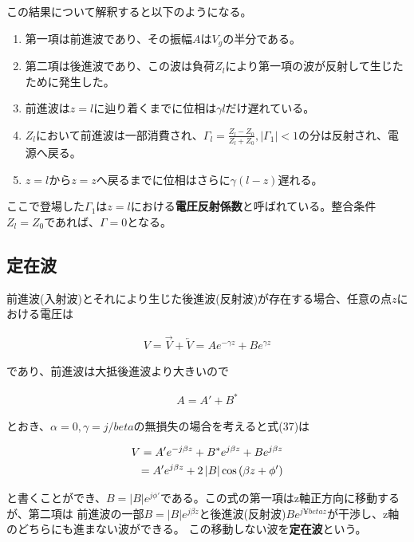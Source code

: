 \documentclass[7pt,uplatex,dvipdfmx,twocolumn]{jsarticle}
\begin{document}
この結果について解釈すると以下のようになる。

\begin{enumerate}
\item 第一項は前進波であり、その振幅$A$は$V_g$の半分である。
\item 第二項は後進波であり、この波は負荷$Z_l$により第一項の波が反射して生じたために発生した。
\item 前進波は$z=l$に辿り着くまでに位相は$\gamma l$だけ遅れている。
\item $Z_l$において前進波は一部消費され、$\varGamma _l=\frac{Z_l-Z_0}{Z_l+Z_0},\left\lvert \varGamma _1\right\rvert <1$の分は反射され、電源へ戻る。
\item $z=l$から$z=z$へ戻るまでに位相はさらに$\gamma \left(  l-z \right)$遅れる。
\end{enumerate}

ここで登場した$\varGamma _1$は$z=l$における\textbf{電圧反射係数}と呼ばれている。整合条件$Z_l=Z_0$であれば、$\varGamma=0$となる。

\subsection{定在波}

前進波(入射波)とそれにより生じた後進波(反射波)が存在する場合、任意の点$z$における電圧は

\begin{align}
V=\overrightarrow{V}+\overleftarrow{V}=Ae^{-\gamma z}+Be^{\gamma z}
\end{align}

であり、前進波は大抵後進波より大きいので

\begin{align}
A=A'+B^*
\end{align}

とおき、$\alpha =0,\gamma = j/beta$の無損失の場合を考えると式(37)は

\begin{align}
V=A'e^{-j\beta z}+B^*e^{j\beta z}+Be^{j\beta z} \\
=A'e^{j\beta z}+2\left\lvert B\right\rvert \cos \left(   \beta z+\phi '\right) \notag
\end{align}

と書くことができ、$B=\left\lvert B\right\rvert e^{j\phi '} $である。この式の第一項はz軸正方向に移動するが、第二項は
前進波の一部$B=\left\lvert B\right\rvert e^{j\beta z}$と後進波(反射波)$Be^{j¥beta z}$が干渉し、z軸のどちらにも進まない波ができる。
この移動しない波を\textbf{定在波}という。
\end{document}
